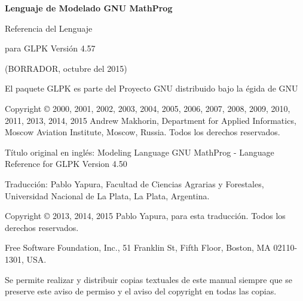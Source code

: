 \documentclass[11pt,spanish]{report}
\begin{document}
\thispagestyle{empty}

\begin{center}

\vspace*{1.5in}

\begin{huge}
\sf\bfseries Lenguaje de Modelado GNU MathProg
\end{huge}

\vspace{0.5in}

\begin{LARGE}
\sf Referencia del Lenguaje
\end{LARGE}

\vspace{0.5in}

\begin{LARGE}
\sf para GLPK Versión 4.57
\end{LARGE}

\vspace{0.5in}
\begin{Large}
\sf (BORRADOR, octubre del 2015)
\end{Large}

\end{center}

\newpage

\vspace*{1in}

\vfill

\noindent
El paquete GLPK es parte del Proyecto GNU distribuido bajo la égida de GNU

\noindent
Copyright \copyright{} 2000, 2001, 2002, 2003, 2004, 2005, 2006, 2007, 2008, 2009, 2010, 2011, 2013, 2014, 2015 Andrew Makhorin, Department for Applied Informatics, Moscow Aviation Institute, Moscow, Russia. Todos los derechos reservados.

\noindent
Título original en inglés: Modeling Language GNU MathProg - Language Reference for GLPK Version 4.50

\noindent
Traducción: Pablo Yapura, Facultad de Ciencias Agrarias y Forestales, Universidad Nacional de La Plata, La Plata, Argentina.

\noindent
Copyright \copyright{} 2013, 2014, 2015 Pablo Yapura, para esta traducción. Todos los derechos reservados.

\noindent
Free Software Foundation, Inc., 51 Franklin St, Fifth Floor, Boston,
MA 02110-1301, USA.

\noindent
Se permite realizar y distribuir copias textuales de este manual siempre que se preserve este aviso de permiso y el aviso del copyright en todas las copias.
\end{document}

